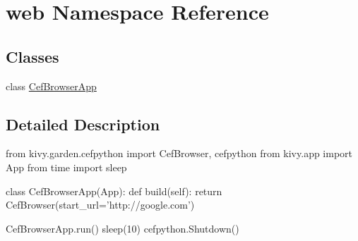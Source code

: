 \hypertarget{namespaceweb}{}\section{web Namespace Reference}
\label{namespaceweb}
\subsection*{Classes}
\begin{DoxyCompactItemize}
\item 
class \hyperlink{classweb_1_1CefBrowserApp}{Cef\+Browser\+App}
\end{DoxyCompactItemize}


\subsection{Detailed Description}
\begin{DoxyVerb}from kivy.garden.cefpython import CefBrowser, cefpython
from kivy.app import App
from time import sleep

class CefBrowserApp(App):
def build(self):
    return CefBrowser(start_url='http://google.com')

CefBrowserApp.run()
sleep(10)
cefpython.Shutdown()
\end{DoxyVerb}
 